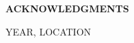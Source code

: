 %
%
%
%

\newpage

\begin{center}

{\large \bf ACKNOWLEDGMENTS } %

\end{center}

\vspace{0.8cm}

\vspace{1.8cm}
YEAR, LOCATION

